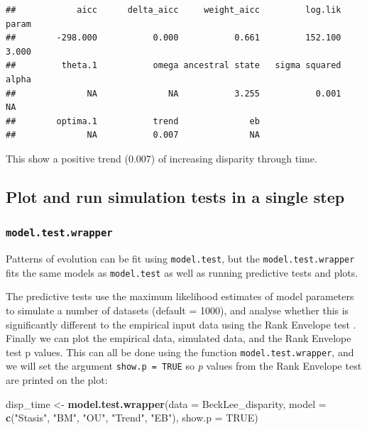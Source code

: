 \documentclass[]{book}
\newenvironment{Shaded}{\begin{snugshade}}{\end{snugshade}}
\newcommand{\DataTypeTok}[1]{\textcolor[rgb]{0.13,0.29,0.53}{#1}}
\newcommand{\KeywordTok}[1]{\textcolor[rgb]{0.13,0.29,0.53}{\textbf{#1}}}
\newcommand{\NormalTok}[1]{#1}
\newcommand{\OtherTok}[1]{\textcolor[rgb]{0.56,0.35,0.01}{#1}}
\newcommand{\StringTok}[1]{\textcolor[rgb]{0.31,0.60,0.02}{#1}}
\begin{document}
\begin{verbatim}
##            aicc      delta_aicc     weight_aicc         log.lik           param 
##        -298.000           0.000           0.661         152.100           3.000 
##         theta.1           omega ancestral state   sigma squared           alpha 
##              NA              NA           3.255           0.001              NA 
##        optima.1           trend              eb 
##              NA           0.007              NA
\end{verbatim}

This show a positive trend (0.007) of increasing disparity through time.

\hypertarget{plot-and-run-simulation-tests-in-a-single-step}{%
\subsection{Plot and run simulation tests in a single step}\label{plot-and-run-simulation-tests-in-a-single-step}}

\hypertarget{model.test.wrapper}{%
\subsubsection{\texorpdfstring{\texttt{model.test.wrapper}}{model.test.wrapper}}\label{model.test.wrapper}}

Patterns of evolution can be fit using \texttt{model.test}, but the \texttt{model.test.wrapper} fits the same models as \texttt{model.test} as well as running predictive tests and plots.

The predictive tests use the maximum likelihood estimates of model parameters to simulate a number of datasets (default = 1000), and analyse whether this is significantly different to the empirical input data using the Rank Envelope test \citep{murrell2018global}.
Finally we can plot the empirical data, simulated data, and the Rank Envelope test p values.
This can all be done using the function \texttt{model.test.wrapper}, and we will set the argument \texttt{show.p\ =\ TRUE} so \emph{p} values from the Rank Envelope test are printed on the plot:

\begin{Shaded}
\begin{Highlighting}[]
\NormalTok{disp_time <-}\StringTok{ }\KeywordTok{model.test.wrapper}\NormalTok{(}\DataTypeTok{data =}\NormalTok{ BeckLee_disparity,}
                    \DataTypeTok{model =} \KeywordTok{c}\NormalTok{(}\StringTok{"Stasis"}\NormalTok{, }\StringTok{"BM"}\NormalTok{, }\StringTok{"OU"}\NormalTok{, }\StringTok{"Trend"}\NormalTok{, }\StringTok{"EB"}\NormalTok{),}
                                \DataTypeTok{show.p =} \OtherTok{TRUE}\NormalTok{)}
\end{Highlighting}
\end{Shaded}
\end{document}
